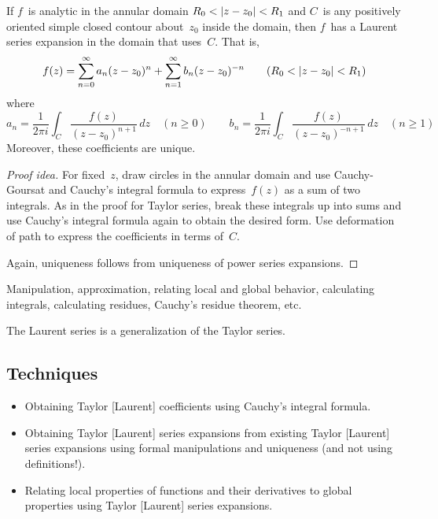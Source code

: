 \begin{thm}
If \(f\)~is analytic in the annular domain \(R_0<\abs{z-z_0}<R_1\) and \(C\)~is any positively oriented simple closed contour about~\(z_0\) inside the domain, then \(f\)~has a Laurent series expansion in the domain that uses~\(C\). That is,
\[f(z)=\sum_{n=0}^\infty a_n(z-z_0)^n+\sum_{n=1}^\infty b_n(z-z_0)^{-n}\qquad(R_0<\abs{z-z_0}<R_1)\]
where
\[a_n=\frac{1}{2\pi i}\int_C\frac{f(z)}{(z-z_0)^{n+1}}\,dz\quad(n\ge0)\qquad b_n=\frac{1}{2\pi i}\int_C\frac{f(z)}{(z-z_0)^{-n+1}}\,dz\quad(n\ge1)\]
Moreover, these coefficients are unique.
\end{thm}
\begin{proof}[Proof idea]
For fixed~\(z\), draw circles in the annular domain and use Cauchy-Goursat and Cauchy's integral formula to express~\(f(z)\) as a sum of two integrals. As in the proof for Taylor series, break these integrals up into sums and use Cauchy's integral formula again to obtain the desired form. Use deformation of path to express the coefficients in terms of~\(C\).

Again, uniqueness follows from uniqueness of power series expansions.
\end{proof}
\begin{app}
Manipulation, approximation, relating local and global behavior, calculating integrals, calculating residues, Cauchy's residue theorem, etc.
\end{app}

\begin{rmk}
The Laurent series is a generalization of the Taylor series.
\end{rmk}

\subsection*{Techniques}
\begin{itemize}[itemsep=0pt]
\item Obtaining Taylor [Laurent] coefficients using Cauchy's integral formula.
\item Obtaining Taylor [Laurent] series expansions from existing Taylor [Laurent] series expansions using formal manipulations and uniqueness (and not using definitions!).
\item Relating local properties of functions and their derivatives to global properties using Taylor [Laurent] series expansions.
\end{itemize}
